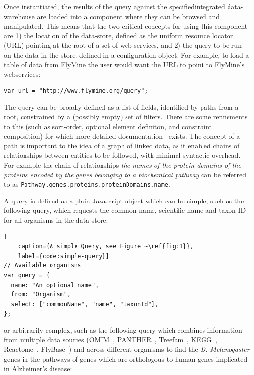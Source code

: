 \documentclass[10pt,a4paper,twocolumn]{article}
\begin{document}
Once instantiated, the results of the query against the specifiedintegrated
data-warehouse are loaded into a component where they can be browsed and
manipulated.  This means that the two critical concepts for using this component
are 1) the location of the data-store, defined as the uniform resource locator
(URL) pointing at the root of a set of web-services, and 2) the query to be run
on the data in the store, defined in a configuration object. For example, to
load a table of data from FlyMine the user would want the URL to point to
FlyMine's webservices:

\begin{lstlisting}[caption={Specifying the Data-Store}, label={code:set-url}]
var url = "http://www.flymine.org/query";
\end{lstlisting}

The query can be broadly defined as a list of fields, identified by
paths from a root, constrained by a (possibly empty) set of filters. There
are some refinements to this (such as sort-order, optional element definiton,
and constraint composition) for which more detailed documentation~\cite{site:pqdocs}
exists. The concept of a path is important to the idea of a graph of linked
data, as it enabled chains of relationships between entities to be followed, with
minimal syntactic overhead. For example the chain of relationships \emph{the names
of the protein domains of the proteins encoded by the genes belonging to a biochemical
pathway} can be referred to as \texttt{Pathway.genes.proteins.proteinDomains.name}.

A query is defined as a plain Javascript object which can be simple, such as the 
following query, which requests the common name, scientific name and
taxon ID for all organisms in the data-store:

\begin{lstlisting}[
    caption={A simple Query, see Figure ~\ref{fig:1}},
    label={code:simple-query}]
// Available organisms
var query = {
  name: "An optional name",
  from: "Organism",
  select: ["commonName", "name", "taxonId"],
};
\end{lstlisting}

or arbitrarily complex, such as the following query which combines information
from multiple data sources (OMIM~\cite{omim}, PANTHER~\cite{panther},
Treefam~\cite{treefam}, KEGG~\cite{kegg}, Reactome~\cite{reactome},
FlyBase~\cite{flybase}) and across different organisms to find the \textit{D.
Melanogaster}  genes in the pathways of genes which are orthologous to human
genes implicated in Alzheimer's disease:
\end{document}
